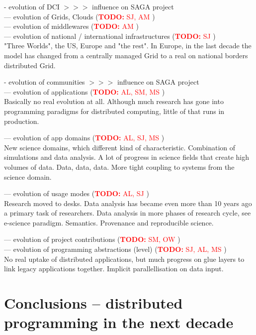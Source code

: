 \documentclass{article}
\newcommand{\B}[1]{\textbf{#1}}
\newcommand{\nind}{\noindent}
\newcommand{\todo}[1]{{\textcolor{red}{\B{TODO:} #1 }}}
\begin{document}
 - evolution of DCI $>>>$ influence on SAGA project\\
 --- evolution of Grids, Clouds (\todo{SJ, AM})\\
 --- evolution of middlewares (\todo{AM})\\
 --- evolution of national / international infrastructures (\todo{SJ})\\

"Three Worlds", the US, Europe and "the rest".
In Europe, in the last decade the model has changed from a centrally managed Grid to a real on national borders distributed Grid.

 
 \nind
 - evolution of communities  $>>>$ influence on SAGA project\\
 --- evolution of applications (\todo{AL, SM, MS})\\
 
Basically no real evolution at all. Although much research has gone into programming paradigms for distributed computing, little of that runs in production.
 
 --- evolution of app domains (\todo{AL, SJ, MS})\\
 
 New science domains, which different kind of characteristic.
 Combination of simulations and data analysis. A lot of progress in science fields that create high volumes of data.
Data, data, data.
More tight coupling to systems from the science domain.
 
 --- evolution of usage modes (\todo{AL, SJ})\\
 
 Research moved to desks. Data analysis has became even more than 10 years ago a primary task of researchers.
 Data analysis in more phases of research cycle, see e-science paradigm.
Semantics.
Provenance and reproducible science.
  
 --- evolution of project contributions (\todo{SM, OW})\\
 
 --- evolution of programming abstractions (level) (\todo{SJ, AL, MS})\\
 
No real uptake of distributed applications, but much progress on glue layers to link legacy applications together.
Implicit parallellisation on data input.


\section{Conclusions -- distributed programming in the next decade}







\footnotesize


\end{document}
